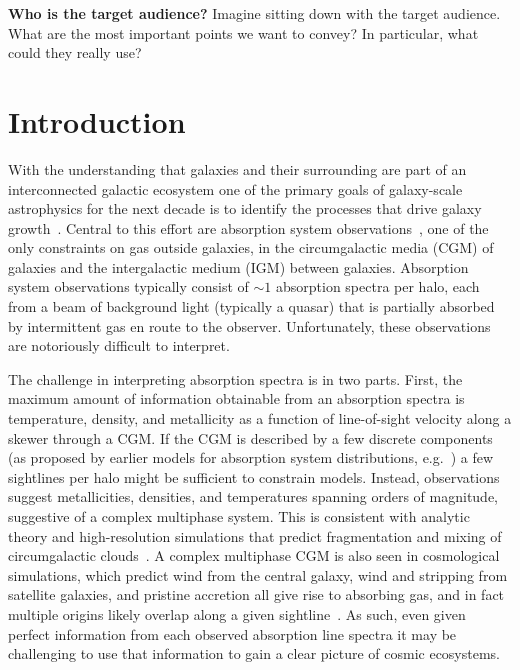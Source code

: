 \documentclass[fleqn,usenatbib]{mnras}
\newcommand{\todo}[1]{\textcolor{Maroon}{\textbf{Address: #1}}}
\begin{document}
\textbf{Who is the target audience?}
Imagine sitting down with the target audience.
What are the most important points we want to convey?
In particular, what could they really use?

\section{Introduction}

With the understanding that galaxies and their surrounding are part of an interconnected galactic ecosystem one of the primary goals of galaxy-scale astrophysics for the next decade is to identify the processes that drive galaxy growth~\citep{Decadal2020}.
Central to this effort are absorption system observations~\citep[e.g.][]{Bahcall1993, Lanzetta1995, Lauroesch1996, Churchill1996}, one of the only constraints on gas outside galaxies, in the circumgalactic media (CGM) of galaxies and the intergalactic medium (IGM) between galaxies.
Absorption system observations typically consist of $\sim 1$ absorption spectra per halo, each from a beam of background light (typically a quasar) that is partially absorbed by intermittent gas en route to the observer.
Unfortunately, these observations are notoriously difficult to interpret.

The challenge in interpreting absorption spectra is in two parts.
First, the maximum amount of information obtainable from an absorption spectra is temperature, density, and metallicity as a function of line-of-sight velocity along a skewer through a CGM.
If the CGM is described by a few discrete components (as proposed by earlier models for absorption system distributions, e.g.~\citealt{Srianand1994, Das2001, Maller2003}) a few sightlines per halo might be sufficient to constrain models.
Instead, observations suggest metallicities, densities, and temperatures spanning orders of magnitude, suggestive of a complex multiphase system.
This is consistent with analytic theory and high-resolution simulations that predict fragmentation and mixing of circumgalactic clouds~\citep[e.g.][\todo{There's ton's of work on this, let's expand these references.}]{Maller2004}.
A complex multiphase CGM is also seen in cosmological simulations, which predict wind from the central galaxy, wind and stripping from satellite galaxies, and pristine accretion all give rise to absorbing gas, and in fact multiple origins likely overlap along a given sightline~\citep[e.g.][]{Hafen2019, Hafen2020}.
As such, even given perfect information from each observed absorption line spectra it may be challenging to use that information to gain a clear picture of cosmic ecosystems.
\end{document}
